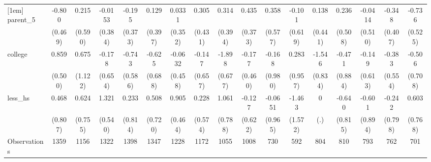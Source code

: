 {\begin{tabular}{l*{16}{c}}
[1em]
parent\_5            &      -0.800         &       0.215         &     -0.0153         &      -0.195         &       0.129         &      0.0331         &       0.305         &       0.314         &       0.435         &       0.358         &      -0.101         &       0.138         &       0.236         &     -0.0414         &      -0.348         &      -0.736         \\
                    &     (0.469)         &     (0.590)         &     (0.384)         &     (0.373)         &     (0.397)         &     (0.352)         &     (0.431)         &     (0.394)         &     (0.373)         &     (0.577)         &     (0.619)         &     (0.441)         &     (0.508)         &     (0.510)         &     (0.407)         &     (0.525)         \\
[1em]
college             &       0.859         &       0.675         &      -0.178         &      -0.743         &      -0.625         &     -0.0632         &      -0.147         &      -1.898\sym{**} &      -0.177         &      -0.168         &       0.283         &      -1.546         &      -0.471         &      -0.149         &      -0.383         &      -0.506         \\
                    &     (0.500)         &     (1.122)         &     (0.654)         &     (0.586)         &     (0.688)         &     (0.458)         &     (0.657)         &     (0.677)         &     (0.460)         &     (0.980)         &     (0.957)         &     (0.834)         &     (0.884)         &     (0.613)         &     (0.554)         &     (0.708)         \\
[1em]
less\_hs             &       0.468         &       0.624         &       1.321\sym{*}  &       0.233         &       0.508         &       0.905         &       0.228         &       1.061         &      -0.127         &     -0.0651         &      -1.463         &           0         &      -0.640         &      -0.601         &      -0.242         &       0.603         \\
                    &     (0.807)         &     (0.755)         &     (0.540)         &     (0.814)         &     (0.720)         &     (0.464)         &     (0.574)         &     (0.788)         &     (0.622)         &     (0.965)         &     (1.572)         &         (.)         &     (0.815)         &     (0.894)         &     (0.798)         &     (0.768)         \\
\hline
Observations        &        1359         &        1156         &        1322         &        1398         &        1347         &        1228         &        1172         &        1055         &        1008         &         730         &         592         &         804         &         810         &         793         &         762         &         701         \\

\end{tabular}}
